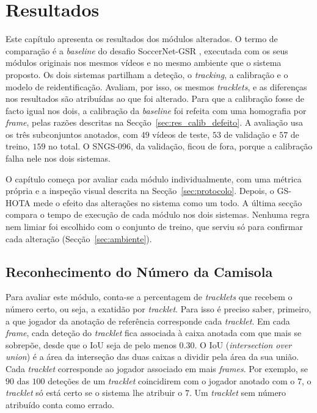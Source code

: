 \chapter{Resultados}\label{cap:resultados}

Este capítulo apresenta os resultados dos módulos alterados. O termo de comparação é a \emph{baseline} do desafio SoccerNet-GSR \citep{somers2024soccernet}, executada com os seus módulos originais nos mesmos vídeos e no mesmo ambiente que o sistema proposto. Os dois sistemas partilham a deteção, o \emph{tracking}, a calibração e o modelo de reidentificação. Avaliam, por isso, os mesmos \emph{tracklets}, e as diferenças nos resultados são atribuídas ao que foi alterado. Para que a calibração fosse de facto igual nos dois, a calibração da \emph{baseline} foi refeita com uma homografia por \emph{frame}, pelas razões descritas na Secção~\ref{sec:res_calib_defeito}. A avaliação usa os três subconjuntos anotados, com $49$ vídeos de teste, $53$ de validação e $57$ de treino, $159$ no total. O SNGS-096, da validação, ficou de fora, porque a calibração falha nele nos dois sistemas.

O capítulo começa por avaliar cada módulo individualmente, com uma métrica própria e a inspeção visual descrita na Secção~\ref{sec:protocolo}. Depois, o GS-HOTA mede o efeito das alterações no sistema como um todo. A última secção compara o tempo de execução de cada módulo nos dois sistemas. Nenhuma regra nem limiar foi escolhido com o conjunto de treino, que serviu só para confirmar cada alteração (Secção~\ref{sec:ambiente}).

\section{Reconhecimento do Número da Camisola}\label{sec:res_jnr}

Para avaliar este módulo, conta-se a percentagem de \emph{tracklets} que recebem o número certo, ou seja, a exatidão por \emph{tracklet}. Para isso é preciso saber, primeiro, a que jogador da anotação de referência corresponde cada \emph{tracklet}. Em cada \emph{frame}, cada deteção do \emph{tracklet} fica associada à caixa anotada com que mais se sobrepõe, desde que o IoU seja de pelo menos $0.30$. O IoU (\emph{intersection over union}) é a área da interseção das duas caixas a dividir pela área da sua união. Cada \emph{tracklet} corresponde ao jogador associado em mais \emph{frames}. Por exemplo, se $90$ das $100$ deteções de um \emph{tracklet} coincidirem com o jogador anotado com o $7$, o \emph{tracklet} só está certo se o sistema lhe atribuir o $7$. Um \emph{tracklet} sem número atribuído conta como errado.


